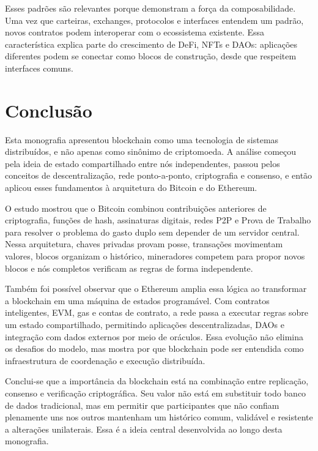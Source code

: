 \documentclass[12pt,a4paper]{report}
\begin{document}
Esses padrões são relevantes porque demonstram a força da composabilidade. Uma vez que carteiras, exchanges, protocolos e interfaces entendem um padrão, novos contratos podem interoperar com o ecossistema existente. Essa característica explica parte do crescimento de DeFi, NFTs e DAOs: aplicações diferentes podem se conectar como blocos de construção, desde que respeitem interfaces comuns.

\chapter{Conclusão}

Esta monografia apresentou blockchain como uma tecnologia de sistemas distribuídos, e não apenas como sinônimo de criptomoeda. A análise começou pela ideia de estado compartilhado entre nós independentes, passou pelos conceitos de descentralização, rede ponto-a-ponto, criptografia e consenso, e então aplicou esses fundamentos à arquitetura do Bitcoin e do Ethereum.

O estudo mostrou que o Bitcoin combinou contribuições anteriores de criptografia, funções de hash, assinaturas digitais, redes P2P e Prova de Trabalho para resolver o problema do gasto duplo sem depender de um servidor central. Nessa arquitetura, chaves privadas provam posse, transações movimentam valores, blocos organizam o histórico, mineradores competem para propor novos blocos e nós completos verificam as regras de forma independente.

Também foi possível observar que o Ethereum amplia essa lógica ao transformar a blockchain em uma máquina de estados programável. Com contratos inteligentes, EVM, gas e contas de contrato, a rede passa a executar regras sobre um estado compartilhado, permitindo aplicações descentralizadas, DAOs e integração com dados externos por meio de oráculos. Essa evolução não elimina os desafios do modelo, mas mostra por que blockchain pode ser entendida como infraestrutura de coordenação e execução distribuída.

Conclui-se que a importância da blockchain está na combinação entre replicação, consenso e verificação criptográfica. Seu valor não está em substituir todo banco de dados tradicional, mas em permitir que participantes que não confiam plenamente uns nos outros mantenham um histórico comum, validável e resistente a alterações unilaterais. Essa é a ideia central desenvolvida ao longo desta monografia.
\end{document}
